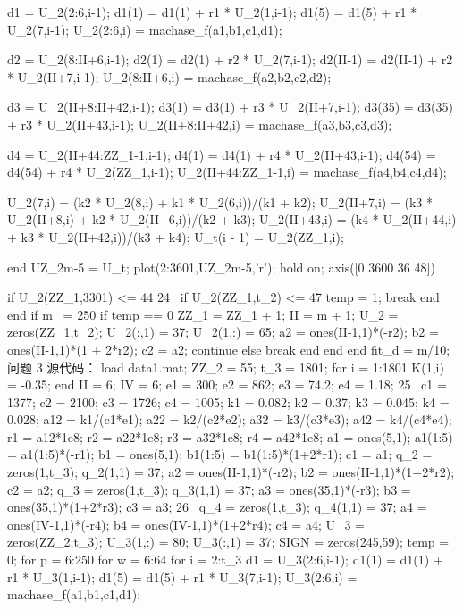 \documentclass{article}
\begin{document}
	d1 = U_2(2:6,i-1); 
	d1(1) = d1(1) + r1 * U_2(1,i-1); 
	d1(5) = d1(5) + r1 * U_2(7,i-1); 
	U_2(2:6,i) = machase_f(a1,b1,c1,d1); 
	
	d2 = U_2(8:II+6,i-1); 
	d2(1) = d2(1) + r2 * U_2(7,i-1); 
	d2(II-1) = d2(II-1) + r2 * U_2(II+7,i-1); 
	U_2(8:II+6,i) = machase_f(a2,b2,c2,d2); 
	
	d3 = U_2(II+8:II+42,i-1); 
	d3(1) = d3(1) + r3 * U_2(II+7,i-1); 
	d3(35) = d3(35) + r3 * U_2(II+43,i-1); 
	U_2(II+8:II+42,i) = machase_f(a3,b3,c3,d3); 
	
	d4 = U_2(II+44:ZZ_1-1,i-1); 
	d4(1) = d4(1) + r4 * U_2(II+43,i-1); 
	d4(54) = d4(54) + r4 * U_2(ZZ_1,i-1); 
	U_2(II+44:ZZ_1-1,i) = machase_f(a4,b4,c4,d4); 
	
	U_2(7,i) = (k2 * U_2(8,i) + k1 * U_2(6,i))/(k1 + k2); 
	U_2(II+7,i) = (k3 * U_2(II+8,i) + k2 * U_2(II+6,i))/(k2 + k3); 
	U_2(II+43,i) = (k4 * U_2(II+44,i) + k3 * U_2(II+42,i))/(k3 + k4); 
	U_t(i - 1) = U_2(ZZ_1,i); 
	
	end 
	UZ_2{m-5} = U_t; 
	plot(2:3601,UZ_2{m-5},'r'); 
	hold on; 
	axis([0 3600 36 48]) 
	
	if U_2(ZZ_1,3301) <= 44 
	24 
	if U_2(ZZ_1,t_2) <= 47 
	temp = 1; 
	break 
	end 
	end 
	if m ~= 250 
	if temp == 0 
	ZZ_1 = ZZ_1 + 1; 
	II = m + 1; 
	U_2 = zeros(ZZ_1,t_2); 
	U_2(:,1) = 37; 
	U_2(1,:) = 65;%
	a2 = ones(II-1,1)*(-r2); 
	b2 = ones(II-1,1)*(1 + 2*r2); 
	c2 = a2; 
	continue 
	else 
	break 
	end 
	end 
	end 
	fit_d = m/10;%
	问题 3 源代码： 
	load data1.mat; 
	ZZ_2 = 55; 
	t_3 = 1801; 
	for i = 1:1801 
	K(1,i) = -0.35; %
	end 
	II = 6; %
	IV = 6; %
	e1 = 300; 
	e2 = 862; 
	e3 = 74.2; 
	e4 = 1.18; 
	25 
	c1 = 1377; 
	c2 = 2100; 
	c3 = 1726; 
	c4 = 1005; 
	k1 = 0.082; 
	k2 = 0.37; 
	k3 = 0.045; 
	k4 = 0.028; 
	a12 = k1/(c1*e1); 
	a22 = k2/(c2*e2); 
	a32 = k3/(c3*e3); 
	a42 = k4/(c4*e4); 
	r1 = a12*1e8; 
	r2 = a22*1e8; 
	r3 = a32*1e8; 
	r4 = a42*1e8; 
	a1 = ones(5,1); 
	a1(1:5) = a1(1:5)*(-r1); 
	b1 = ones(5,1); 
	b1(1:5) = b1(1:5)*(1+2*r1); 
	c1 = a1; 
	q_2 = zeros(1,t_3); 
	q_2(1,1) = 37; 
	a2 = ones(II-1,1)*(-r2); 
	b2 = ones(II-1,1)*(1+2*r2); 
	c2 = a2; 
	q_3 = zeros(1,t_3); 
	q_3(1,1) = 37; 
	a3 = ones(35,1)*(-r3); 
	b3 = ones(35,1)*(1+2*r3); 
	c3 = a3; 
	26 
	q_4 = zeros(1,t_3); 
	q_4(1,1) = 37; 
	a4 = ones(IV-1,1)*(-r4); 
	b4 = ones(IV-1,1)*(1+2*r4); 
	c4 = a4; 
	U_3 = zeros(ZZ_2,t_3); 
	U_3(1,:) = 80; %
	U_3(:,1) = 37; 
	SIGN = zeros(245,59); 
	temp = 0; 
	for p = 6:250 
	for w = 6:64 
	for i = 2:t_3 
	d1 = U_3(2:6,i-1); 
	d1(1) = d1(1) + r1 * U_3(1,i-1); 
	d1(5) = d1(5) + r1 * U_3(7,i-1); 
	U_3(2:6,i) = machase_f(a1,b1,c1,d1); 
	
\end{document}
